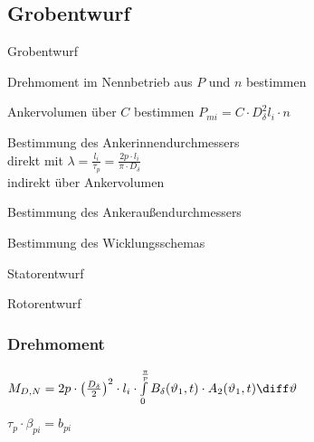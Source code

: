 \begin{sectionbox}
\subsection{Grobentwurf}
\begin{cookbox}{Grobentwurf}
\item Drehmoment im Nennbetrieb aus $P$ und $n$ bestimmen
\item Ankervolumen über $C$ bestimmen $P_{mi} = C\cdot D_\delta^2l_i\cdot n$
\item Bestimmung des Ankerinnendurchmessers\\
direkt mit $\lambda = \frac{l_i}{\tau_p} = \frac{2p\cdot l_i}{\pi\cdot D_\delta}$\\
indirekt über Ankervolumen
\item Bestimmung des Ankeraußendurchmessers
\item Bestimmung des Wicklungsschemas
\item Statorentwurf
\item Rotorentwurf
\end{cookbox}

\subsubsection{Drehmoment}
\begin{emphbox}
	$M_{D,N} = 2p\cdot\left(\frac{D_\delta}{2}\right)^2\cdot l_i\cdot\int\limits_0^{\frac{\pi}{p}}B_\delta(\vartheta_1,t)\cdot A_2(\vartheta_1,t)\diff\vartheta$
\end{emphbox}
$\tau_p\cdot\beta_{pi} = b_{pi}$
\end{sectionbox}

